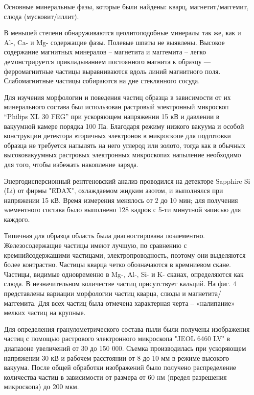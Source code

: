 Основные минеральные фазы, которые были найдены: кварц, магнетит/маггемит, слюда (мусковит/иллит).

В меньшей степени обнаруживаются цеолитоподобные минералы так же, как и Al-, Ca- и Mg- содержащие фазы. Полевые шпаты не выявлены.
Высокое содержание магнитных минералов – магнетита и маггемита – легко демонстрируется прикладыванием постоянного магнита к образцу — ферромагнитные частицы выравниваются вдоль линий магнитного поля. Слабомагнитные частицы собираются на дне стеклянного сосуда.

Для изучения морфологии и поведения частиц образца в зависимости от их минерального состава был использован растровый электронный микроскоп “Philips XL 30 FEG” при ускоряющем напряжении 15 кВ и давлении в вакуумной камере порядка 100 Па. Благодаря режиму низкого вакуума и особой конструкции детектора вторичных электронов в микроскопе для подготовки образца не требуется напылять на него углерод или золото, тогда как в обычных высоковакуумных растровых электронных микроскопах напыление необходимо для того, чтобы избежать накопление заряда. 

Энергодисперсионный рентгеновский анализ проводился на детекторе Sapphire Si (Li) от фирмы "EDAX", охлаждаемом жидким азотом, и выполнялся при напряжении 15 кВ. Время измерения менялось от 2 до 10 мин; для получения элементного состава было выполнено 128 кадров с 5-ти минутной записью для каждого.

Типичная для образца область была диагностирована поэлементно. Железосодержащие частицы имеют лучшую, по сравнению с кремнийсодержащими частицами, электропроводность, поэтому они выделяются более контрастно. Частицы кварца четко обозначаются в кремниевом скане. Частицы, видимые одновременно в Mg-, Al-, Si- и K- сканах, определяются как слюда. В незначительном количестве частиц присутствует кальций. На фиг. 4 представлены вариации морфологии частиц кварца, слюды и магнетита/маггемита. Для всех частиц была отмечена характерная черта – «налипание» мелких частиц на крупные.

Для определения гранулометрического состава пыли были получены изображения частиц с помощью растрового электронного микроскопа "JEOL 6460 LV" в диапазоне увеличений от 30 до 150 000. Съемка производилась при ускоряющем напряжении 30 кВ и рабочем расстоянии от 8 до 10 мм в режиме высокого вакуума. После общей обработки изображений было получено распределение количества частиц в зависимости от размера от 60 нм (предел разрешения микроскопа) до 200 мкм. 

